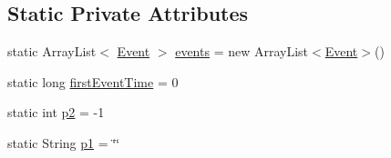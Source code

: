 \subsection*{Static Private Attributes}
\begin{DoxyCompactItemize}
\item 
static Array\-List$<$ \hyperlink{classjenes_1_1performance_1_1_performance_statistics_1_1_event}{Event} $>$ \hyperlink{classjenes_1_1performance_1_1_performance_statistics_a308183eed76478b3b657d4a88bb7abbc}{events} = new Array\-List$<$\hyperlink{classjenes_1_1performance_1_1_performance_statistics_1_1_event}{Event}$>$()
\item 
static long \hyperlink{classjenes_1_1performance_1_1_performance_statistics_a64197b8bd7107ef2b36a491f4f327593}{first\-Event\-Time} = 0
\item 
static int \hyperlink{classjenes_1_1performance_1_1_performance_statistics_adaa717c633db9580fd123aa32d4feac6}{p2} = -\/1
\item 
static String \hyperlink{classjenes_1_1performance_1_1_performance_statistics_a99364fccbfa5da2f1574880af60585e0}{p1} = \char`\"{}\char`\"{}
\end{DoxyCompactItemize}


